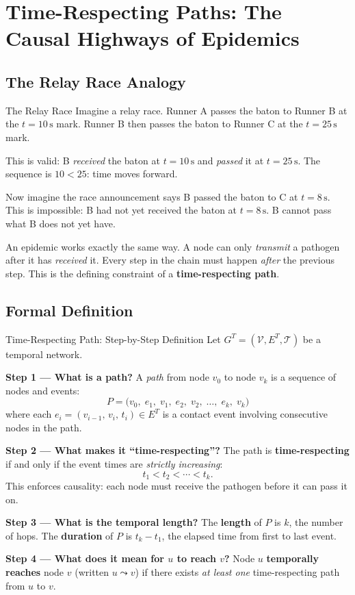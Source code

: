 \section{Time-Respecting Paths: The Causal Highways of Epidemics}
\label{sec:time_respecting_paths}

\subsection{The Relay Race Analogy}

\begin{analogybox}{The Relay Race}
Imagine a relay race. Runner A passes the baton to Runner B at the $t = 10\,\text{s}$ mark.
Runner B then passes the baton to Runner C at the $t = 25\,\text{s}$ mark.

This is valid: B \textit{received} the baton at $t = 10\,\text{s}$ and \textit{passed} it at
$t = 25\,\text{s}$. The sequence is $10 < 25$: time moves forward.

Now imagine the race announcement says B passed the baton to C at $t = 8\,\text{s}$. This is
impossible: B had not yet received the baton at $t = 8\,\text{s}$. B cannot pass what B does
not yet have.

An epidemic works exactly the same way. A node can only \textit{transmit} a pathogen after it
has \textit{received} it. Every step in the chain must happen \emph{after} the previous step.
This is the defining constraint of a \textbf{time-respecting path}.
\end{analogybox}

\subsection{Formal Definition}

\begin{mathbox}{Time-Respecting Path: Step-by-Step Definition}
Let $G^T = (\mathcal{V}, E^T, \mathcal{T})$ be a temporal network.

\textbf{Step 1 --- What is a path?} A \textit{path} from node $v_0$ to node $v_k$ is a
sequence of nodes and events:
\[
  P = \bigl(v_0,\; e_1,\; v_1,\; e_2,\; v_2,\; \ldots,\; e_k,\; v_k\bigr)
\]
where each $e_i = (v_{i-1},\, v_i,\, t_i) \in E^T$ is a contact event involving consecutive
nodes in the path.

\textbf{Step 2 --- What makes it ``time-respecting''?} The path is \textbf{time-respecting}
if and only if the event times are \textit{strictly increasing}:
\[
  t_1 < t_2 < \cdots < t_k.
\]
This enforces causality: each node must receive the pathogen before it can pass it on.

\textbf{Step 3 --- What is the temporal length?} The \textbf{length} of $P$ is $k$, the
number of hops. The \textbf{duration} of $P$ is $t_k - t_1$, the elapsed time from first to
last event.

\textbf{Step 4 --- What does it mean for $u$ to reach $v$?} Node $u$ \textbf{temporally
reaches} node $v$ (written $u \leadsto v$) if there exists \textit{at least one}
time-respecting path from $u$ to $v$.
\end{mathbox}


